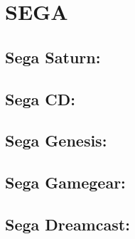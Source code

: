 \section{SEGA}

\subsection{Sega Saturn:}
\subsection{Sega CD:}
\subsection{Sega Genesis:}
\subsection{Sega Gamegear:}
\subsection{Sega Dreamcast:}
